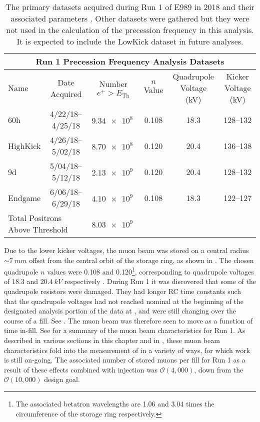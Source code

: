 \begin{landscape}
\begin{table}
\centering
\setlength\tabcolsep{10pt}
\renewcommand{\arraystretch}{1.2}
\begin{tabular*}{1\linewidth}{@{\extracolsep{\fill}}lccccc}
  \hline
    \multicolumn{6}{c}{\textbf{Run 1 Precession Frequency Analysis Datasets}} \\
  \hline\hline
    Name & Date Acquired & Number $e^{+} > E_{\text{Th}}$ & $n$ Value & Quadrupole Voltage (kV) & Kicker Voltage (kV) \\
  \hline
    60h & 4/22/18--4/25/18 & $\SI{9.34e8}{}$ & 0.108 & 18.3 & 128--132 \\
    HighKick & 4/26/18--5/02/18 & $\SI{8.70e8}{}$ & 0.120 & 20.4 & 136--138 \\
    9d & 5/04/18--5/12/18 & $\SI{2.13e9}{}$ & 0.120 & 20.4 & 128--132 \\
    Endgame & 6/06/18--6/29/18 & $\SI{4.10e9}{}$ & 0.108 & 18.3 & 122--127 \\
  \hline
    \multicolumn{2}{l}{Total Positrons Above Threshold} & \multicolumn{1}{c}{$\SI{8.03e9}{}$} & & &  \\
  \hline
\end{tabular*}
\caption[Run 1 datasets]{The primary datasets acquired during Run 1 of E989 in 2018 and their associated parameters \cite{Run1Datasets}. Other datasets were gathered but they were not used in the calculation of the precession frequency in this analysis. It is expected to include the LowKick dataset in future analyses.}
\label{tab:Run1Datasets}
\end{table}
\end{landscape}


Due to the lower kicker voltages, the muon beam was stored on a central radius $\sim\SI{7}{mm}$ offset from the central orbit of the storage ring, as shown in . The chosen quadrupole $n$ values were 0.108 and 0.120\footnote{The associated betatron wavelengths are 1.06 and 3.04 times the circumference of the storage ring respectively.}, corresponding to quadrupole voltages of 18.3 and $\SI{20.4}{kV}$ respectively \cite{tunetable}. During Run 1 it was discovered that some of the quadrupole resistors were damaged. They had longer RC time constants such that the quadrupole voltages had not reached nominal at the beginning of the designated analysis portion of the data at , and were still changing over the course of a fill. See . The muon beam was therefore seen to move as a function of time in-fill. See  for a summary of the muon beam characteristics for Run 1. As described in various sections in this chapter and in , these muon beam characteristics fold into the measurement of \gmtwo in a variety of ways, for which work is still on-going. The associated number of stored muons per fill for Run 1 as a result of these effects combined with injection was $\mathcal{O}(4,000)$, down from the $\mathcal{O}(10,000)$ design goal. 

